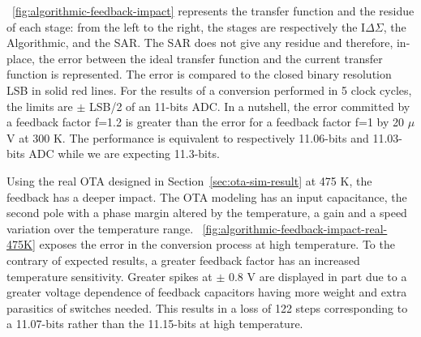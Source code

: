 \figurename~\ref{fig:algorithmic-feedback-impact} represents the transfer function and the residue of each stage: from the left to the right, the stages are respectively the I\(\Delta\Sigma\), the Algorithmic, and the SAR\@. The SAR does not give any residue and therefore, in-place, the error between the ideal transfer function and the current transfer function is represented. The error is compared to the closed binary resolution LSB in solid red lines. For the results of a conversion performed in 5 clock cycles, the limits are $\pm$ LSB/2 of an 11-bits ADC\@. In a nutshell, the error committed by a feedback factor f=1.2 is greater than the error for a feedback factor f=1 by 20 $\mu$V at 300 K. The performance is equivalent to respectively 11.06-bits and 11.03-bits ADC while we are expecting 11.3-bits.

Using the real OTA designed in Section~\ref{sec:ota-sim-result} at 475 K, the feedback has a deeper impact. The OTA modeling has an input capacitance, the second pole with a phase margin altered by the temperature, a gain and a speed variation over the temperature range. \figurename~\ref{fig:algorithmic-feedback-impact-real-475K} exposes the error in the conversion process at high temperature. To the contrary of expected results, a greater feedback factor has an increased temperature sensitivity. Greater spikes at $\pm$ 0.8 V are displayed in part due to a greater voltage dependence of feedback capacitors having more weight and extra parasitics of switches needed. This results in a loss of 122 steps corresponding to a 11.07-bits rather than the 11.15-bits at high temperature.

